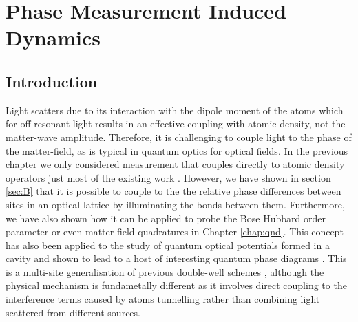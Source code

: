 
\chapter{Phase Measurement Induced Dynamics}

\ifpdf
    \graphicspath{{Chapter6/Figs/Raster/}{Chapter6/Figs/PDF/}{Chapter6/Figs/}}
\else
    \graphicspath{{Chapter6/Figs/Vector/}{Chapter6/Figs/}}
\fi


\section{Introduction}

Light scatters due to its interaction with the dipole moment of the
atoms which for off-resonant light results in an effective coupling
with atomic density, not the matter-wave amplitude. Therefore, it is
challenging to couple light to the phase of the matter-field, as is
typical in quantum optics for optical fields. In the previous chapter
we only considered measurement that couples directly to atomic density
operators just most of the existing work \cite{LP2009, rogers2014,
  mekhov2012, ashida2015, ashida2015a}. However, we have shown in
section \ref{sec:B} that it is possible to couple to the the relative
phase differences between sites in an optical lattice by illuminating
the bonds between them. Furthermore, we have also shown how it can be
applied to probe the Bose Hubbard order parameter or even matter-field
quadratures in Chapter \ref{chap:qnd}. This concept has also been
applied to the study of quantum optical potentials formed in a cavity
and shown to lead to a host of interesting quantum phase diagrams
\cite{caballero2015, caballero2015njp, caballero2016,
  caballero2016a}. This is a multi-site generalisation of previous
double-well schemes \cite{cirac1996, castin1997, ruostekoski1997,
  ruostekoski1998, rist2012}, although the physical mechanism is
fundametally different as it involves direct coupling to the
interference terms caused by atoms tunnelling rather than combining
light scattered from different sources.

